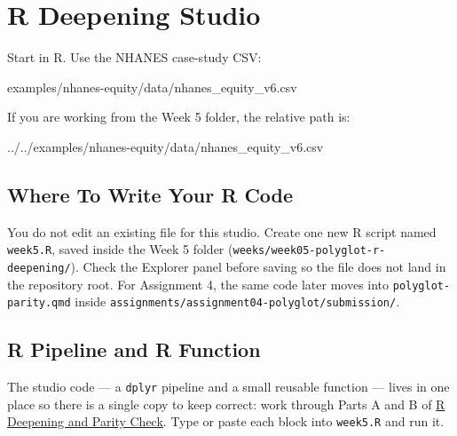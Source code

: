 \documentclass[
  letterpaper,
  DIV=11,
  numbers=noendperiod,
  oneside]{scrreprt}
\newenvironment{Shaded}{\begin{snugshade}}{\end{snugshade}}
\newcommand{\NormalTok}[1]{\textcolor[rgb]{0.00,0.23,0.31}{#1}}
\begin{document}
\section*{R Deepening Studio}\label{r-deepening-studio}


Start in R. Use the NHANES case-study CSV:

\begin{Shaded}
\begin{Highlighting}[numbers=left,,]
\NormalTok{examples/nhanes{-}equity/data/nhanes\_equity\_v6.csv}
\end{Highlighting}
\end{Shaded}

If you are working from the Week 5 folder, the relative path is:

\begin{Shaded}
\begin{Highlighting}[numbers=left,,]
\NormalTok{../../examples/nhanes{-}equity/data/nhanes\_equity\_v6.csv}
\end{Highlighting}
\end{Shaded}

\subsection*{Where To Write Your R
Code}\label{where-to-write-your-r-code}

You do not edit an existing file for this studio. Create one new R
script named \texttt{week5.R}, saved inside the Week 5 folder
(\texttt{weeks/week05-polyglot-r-deepening/}). Check the Explorer panel
before saving so the file does not land in the repository root. For
Assignment 4, the same code later moves into
\texttt{polyglot-parity.qmd} inside
\texttt{assignments/assignment04-polyglot/submission/}.

\subsection*{R Pipeline and R Function}\label{r-pipeline-and-r-function}

The studio code --- a \texttt{dplyr} pipeline and a small reusable
function --- lives in one place so there is a single copy to keep
correct: work through Parts A and B of \href{r-deepening-parity.qmd}{R
Deepening and Parity Check}. Type or paste each block into
\texttt{week5.R} and run it.
\end{document}
